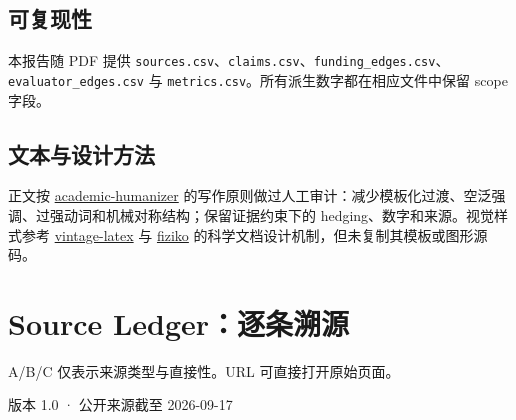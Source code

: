 \documentclass[11pt,twoside]{article}
\begin{document}
\subsection*{可复现性}
本报告随 PDF 提供 \texttt{sources.csv}、\texttt{claims.csv}、\texttt{funding\_edges.csv}、\texttt{evaluator\_edges.csv} 与 \texttt{metrics.csv}。所有派生数字都在相应文件中保留 scope 字段。

\subsection*{文本与设计方法}
正文按 \href{https://github.com/AIScientists-Dev/academic-humanizer}{academic-humanizer} 的写作原则做过人工审计：减少模板化过渡、空泛强调、过强动词和机械对称结构；保留证据约束下的 hedging、数字和来源。视觉样式参考 \href{https://github.com/Foadsf/vintage-latex}{vintage-latex} 与 \href{https://github.com/jemmybutton/fiziko}{fiziko} 的科学文档设计机制，但未复制其模板或图形源码。

\clearpage
\section{Source Ledger：逐条溯源}
\small
A/B/C 仅表示来源类型与直接性。URL 可直接打开原始页面。
\medskip

\normalsize

\printerrule
\begin{center}
\footnotesize 版本 1.0 · 公开来源截至 2026-09-17
\end{center}
\end{document}
